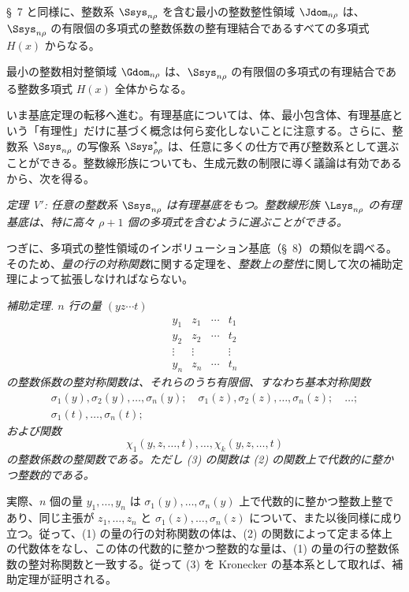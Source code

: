 \documentclass[11pt]{article}
\begin{document}
\S\ 7 と同様に、整数系 $\Ssys_{n\rho}$ を含む最小の整数整性領域 $\Jdom_{n\rho}$ は、$\Ssys_{n\rho}$ の有限個の多項式の整数係数の整有理結合であるすべての多項式 $H(x)$ からなる。

最小の整数相対整領域 $\Gdom_{n\rho}$ は、$\Ssys_{n\rho}$ の有限個の多項式の有理結合である整数多項式 $H(x)$ 全体からなる。

いま基底定理の転移へ進む。有理基底については、体、最小包含体、有理基底という「有理性」だけに基づく概念は何ら変化しないことに注意する。さらに、整数系 $\Ssys_{n\rho}$ の写像系 $\Ssys^*_{\rho\rho}$ は、任意に多くの仕方で再び整数系として選ぶことができる。整数線形族についても、生成元数の制限に導く議論は有効であるから、次を得る。

\emph{定理 V$'$: 任意の整数系 $\Ssys_{n\rho}$ は有理基底をもつ。整数線形族 $\Lsys_{n\rho}$ の有理基底は、特に高々 $\rho+1$ 個の多項式を含むように選ぶことができる。}

つぎに、多項式の整性領域のインボリューション基底（\S\ 8）の類似を調べる。そのため、\emph{量の行の対称関数}に関する定理を、\emph{整数上の整性}に関して次の補助定理によって拡張しなければならない。

\emph{補助定理. $n$ 行の量 $(yz\cdots t)$}
\begin{equation}
\begin{array}{cccc}
  y_1&z_1&\cdots&t_1\\
  y_2&z_2&\cdots&t_2\\
  \vdots&\vdots&&\vdots\\
  y_n&z_n&\cdots&t_n
\end{array}
\tag{1}
\end{equation}
\emph{の整数係数の整対称関数は、それらのうち有限個、すなわち基本対称関数}
\begin{equation}
\begin{gathered}
  \sigma_1(y),\sigma_2(y),\ldots,\sigma_n(y);\quad
  \sigma_1(z),\sigma_2(z),\ldots,\sigma_n(z);\quad\ldots;\\
  \sigma_1(t),\ldots,\sigma_n(t);
\end{gathered}
\tag{2}
\end{equation}
\emph{および関数}
\begin{equation}
  \chi_1(y,z,\ldots,t),\ldots,\chi_k(y,z,\ldots,t)
\tag{3}
\end{equation}
\emph{の整数係数の整関数である。ただし (3) の関数は (2) の関数上で代数的に整かつ整数的である。}

実際、$n$ 個の量 $y_1,\ldots,y_n$ は $\sigma_1(y),\ldots,\sigma_n(y)$ 上で代数的に整かつ整数上整であり、同じ主張が $z_1,\ldots,z_n$ と $\sigma_1(z),\ldots,\sigma_n(z)$ について、また以後同様に成り立つ。従って、(1) の量の行の対称関数の体は、(2) の関数によって定まる体上の代数体をなし、この体の代数的に整かつ整数的な量は、(1) の量の行の整数係数の整対称関数と一致する。従って (3) を Kronecker の基本系として取れば、補助定理が証明される。
\end{document}
